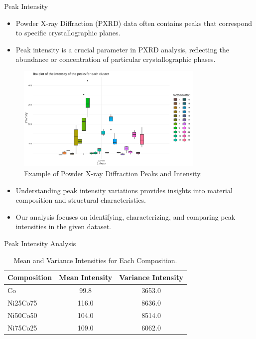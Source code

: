 \documentclass[aspectratio=169]{beamer}
\begin{document}
\begin{frame}{Peak Intensity}
    \begin{itemize}
        \item Powder X-ray Diffraction (PXRD) data often contains peaks that correspond to specific crystallographic planes.
        \item Peak intensity is a crucial parameter in PXRD analysis, reflecting the abundance or concentration of particular crystallographic phases.
    \end{itemize}

    \begin{figure}
        \includegraphics[width=0.8\textwidth]{../plot/intensity.png}
        \caption{Example of Powder X-ray Diffraction Peaks and Intensity.}
    \end{figure}

    \begin{itemize}
        \item Understanding peak intensity variations provides insights into material composition and structural characteristics.
        \item Our analysis focuses on identifying, characterizing, and comparing peak intensities in the given dataset.
    \end{itemize}
\end{frame}

\begin{frame}[fragile]{Peak Intensity Analysis}
\begin{table}[h]
\centering
\begin{tabular}{lcc}
\toprule
Composition & Mean Intensity & Variance Intensity \\
\midrule
Co          & 99.8       & 3653.0        \\
Ni25Co75    & 116.0      & 8636.0        \\
Ni50Co50    & 104.0      & 8514.0        \\
Ni75Co25    & 109.0      & 6062.0        \\
\bottomrule
\end{tabular}
\caption{Mean and Variance Intensities for Each Composition.}
\label{tab:composition_stats}
\end{table}
\end{frame}
\end{document}
